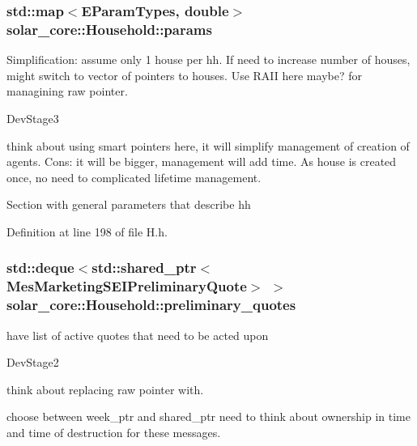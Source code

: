 \subsubsection[{params}]{\setlength{\rightskip}{0pt plus 5cm}std\+::map$<${\bf E\+Param\+Types}, double$>$ solar\+\_\+core\+::\+Household\+::params\hspace{0.3cm}{\ttfamily [protected]}}\label{classsolar__core_1_1_household_a41d61dc3bab971cb19170341b77d9df8}
Simplification\+: assume only 1 house per hh. If need to increase number of houses, might switch to vector of pointers to houses. Use R\+A\+I\+I here maybe? for managining raw pointer.\begin{DoxyRefDesc}{Dev\+Stage3}
\item[\hyperlink{_dev_stage3__DevStage3000003}{Dev\+Stage3}]think about using smart pointers here, it will simplify management of creation of agents. Cons\+: it will be bigger, management will add time. As house is created once, no need to complicated lifetime management. \end{DoxyRefDesc}


Section with general parameters that describe hh 

Definition at line 198 of file H.\+h.

\hypertarget{classsolar__core_1_1_household_a297842358a2d79db160566106972bc0d}{}
\subsubsection[{preliminary\+\_\+quotes}]{\setlength{\rightskip}{0pt plus 5cm}std\+::deque$<$std\+::shared\+\_\+ptr$<${\bf Mes\+Marketing\+S\+E\+I\+Preliminary\+Quote}$>$ $>$ solar\+\_\+core\+::\+Household\+::preliminary\+\_\+quotes\hspace{0.3cm}{\ttfamily [protected]}}\label{classsolar__core_1_1_household_a297842358a2d79db160566106972bc0d}
have list of active quotes that need to be acted upon\begin{DoxyRefDesc}{Dev\+Stage2}
\item[\hyperlink{_dev_stage2__DevStage2000013}{Dev\+Stage2}]think about replacing raw pointer with. 

choose between week\+\_\+ptr and shared\+\_\+ptr need to think about ownership in time and time of destruction for these messages. \end{DoxyRefDesc}


